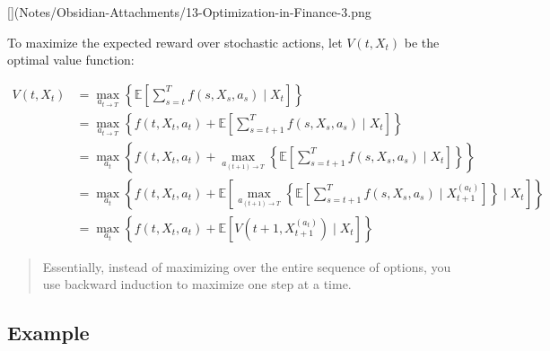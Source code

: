 \documentclass[
  oneside]{book}
\begin{document}
{[}{]}(Notes/Obsidian-Attachments/13-Optimization-in-Finance-3.png\textbar300{]}{]}

To maximize the expected reward over stochastic actions, let \(V(t, X_{t})\) be the optimal value function:

\[
\begin{aligned}
V\left(t, X_t\right) & =\max _{a_{t \rightarrow T}}\left\{\mathbb{E}\left[\sum_{s=t}^T f\left(s, X_s, a_s\right) \mid X_t\right]\right\} \\
& =\max _{a_{t \rightarrow T}}\left\{f\left(t, X_t, a_t\right)+\mathbb{E}\left[\sum_{s=t+1}^T f\left(s, X_s, a_s\right) \mid X_t\right]\right\} \\
& =\max _{a_t}\left\{f\left(t, X_t, a_t\right)+\max _{a_{(t+1) \rightarrow T}}\left\{\mathbb{E}\left[\sum_{s=t+1}^T f\left(s, X_s, a_s\right) \mid X_t\right]\right\}\right\} \\
& =\max _{a_t}\left\{f\left(t, X_t, a_t\right)+\mathbb{E}\left[\max _{a_{(t+1) \rightarrow T}}\left\{\mathbb{E}\left[\sum_{s=t+1}^T f\left(s, X_s, a_s\right) \mid X_{t+1}^{\left(a_t\right)}\right]\right\} \mid X_t\right]\right\} \\
& =\max _{a_t}\left\{f\left(t, X_t, a_t\right)+\mathbb{E}\left[V\left(t+1, X_{t+1}^{\left(a_t\right)}\right) \mid X_t\right]\right\}
\end{aligned}
\]

\begin{quote}
Essentially, instead of maximizing over the entire sequence of options, you use backward induction to maximize one step at a time.
\end{quote}

\hypertarget{example-8}{%
\subsection{Example}\label{example-8}}
\end{document}
